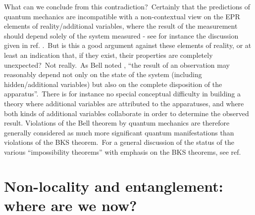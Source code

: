 \documentclass[12pt,onecolumn]{article}%
\begin{document}
What can we conclude from this contradiction?\ Certainly that the predictions
of quantum mechanics are incompatible with a non-contextual view on the EPR
elements of reality/additional variables, where the result of the measurement
should depend solely of the system measured - see for instance the discussion
given in ref. \cite{AP}.\ But is this a good argument against these elements
of reality, or at least an indication that, if they exist, their properties
are completely unexpected?\ Not really.\ As Bell noted \cite{Bell-1}, ``the
result of an observation may reasonably depend not only on the state of the
system (including hidden/additional variables) but also on the complete
disposition of the apparatus''.\ There is for instance no special conceptual
difficulty in building a theory where additional variables are attributed to
the apparatuses, and where both kinds of additional variables collaborate in
order to determine the observed result. Violations of the Bell theorem by
quantum mechanics are therefore generally considered as much more significant
quantum manifestations than violations of the BKS theorem.\ For a general
discussion of the status of the various ``impossibility theorems'' with
emphasis on the BKS theorems, see ref.\ \cite{Mermin}

\section{Non-locality and entanglement: where are we now?}
\end{document}
